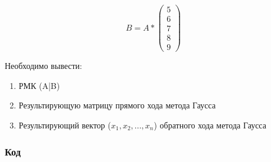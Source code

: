 \documentclass[bachelor, och, pract]{SCWorks}
\begin{document}
$$ B = A *
\begin{pmatrix}
5 \\
6 \\
7 \\
8 \\
9
\end{pmatrix}
$$

Необходимо вывести: 
\begin{enumerate}
    \item РМК (A|B)
    \item Результирующую матрицу прямого хода метода Гаусса
    \item Результирующий вектор ($x_1, x_2, ..., x_n$) обратного хода метода Гаусса
\end{enumerate}

\subsubsection{Код}
\end{document}
